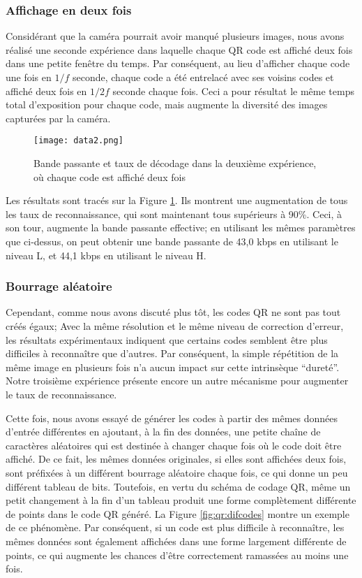 \subsubsection{Affichage en deux fois}

Considérant que la caméra pourrait avoir manqué plusieurs images, nous avons réalisé une seconde expérience dans laquelle chaque QR code est affiché deux fois dans une petite fenêtre du temps. Par conséquent, au lieu d'afficher chaque code une fois en $1/f$ seconde, chaque code a été entrelacé avec ses voisins codes et affiché deux fois en $1/2f$ seconde chaque fois. Ceci a pour résultat le même temps total d'exposition pour chaque code, mais augmente la diversité des images capturées par la caméra.

\begin{figure}[ht]
\begin{center}
\centering
\texttt{[image: data2.png]}
\caption{Bande passante et taux de décodage dans la deuxième expérience, où chaque code est affiché deux fois}
\label{img-exp2}
\end{center}
\end{figure}

Les résultats sont tracés sur la Figure \ref{img-exp2}. Ils montrent une augmentation de tous les taux de reconnaissance, qui sont maintenant tous supérieurs à 90\%. Ceci, à son tour, augmente la bande passante effective; en utilisant les mêmes paramètres que ci-dessus, on peut obtenir une bande passante de 43,0 kbps en utilisant le niveau L, et 44,1 kbps en utilisant le niveau H.

\subsubsection{Bourrage aléatoire}

Cependant, comme nous avons discuté plus tôt, les codes QR ne sont pas tout créés égaux; Avec la même résolution et le même niveau de correction d'erreur, les résultats expérimentaux indiquent que certains codes semblent être plus difficiles à reconnaître que d'autres. Par conséquent, la simple répétition de la même image en plusieurs fois n'a aucun impact sur cette intrinsèque ``dureté''. Notre troisième expérience présente encore un autre mécanisme pour augmenter le taux de reconnaissance.

Cette fois, nous avons essayé de générer les codes à partir des mêmes données d'entrée différentes en ajoutant, à la fin des données, une petite chaîne de caractères aléatoires qui est destinée à changer chaque fois où le code doit être affiché. De ce fait, les mêmes données originales, si elles sont affichées deux fois, sont préfixées à un différent bourrage aléatoire chaque fois, ce qui donne un peu différent tableau de bits. Toutefois, en vertu du schéma de codage QR, même un petit changement à la fin d'un tableau produit une forme complètement différente de points dans le code QR généré. La Figure \ref{fig:qr:difcodes} montre un exemple de ce phénomène. Par conséquent, si un code est plus difficile à reconnaître, les mêmes données sont également affichées dans une forme largement différente de points, ce qui augmente les chances d'être correctement ramassées au moins une fois.

